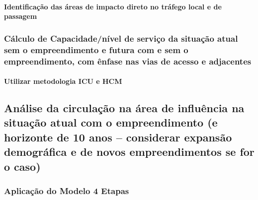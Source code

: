 \documentclass[]{article}
\let\oldparagraph\paragraph
\renewcommand{\paragraph}[1]{\oldparagraph{#1}\mbox{}}
\begin{document}
\hypertarget{identificauxe7uxe3o-das-uxe1reas-de-impacto-direto-no-truxe1fego-local-e-de-passagem}{%
\paragraph{Identificação das áreas de impacto direto no tráfego local e
de
passagem}\label{identificauxe7uxe3o-das-uxe1reas-de-impacto-direto-no-truxe1fego-local-e-de-passagem}}

\hypertarget{cuxe1lculo-de-capacidadenuxedvel-de-serviuxe7o-da-situauxe7uxe3o-atual-sem-o-empreendimento-e-futura-com-e-sem-o-empreendimento-com-uxeanfase-nas-vias-de-acesso-e-adjacentes}{%
\subsubsection{Cálculo de Capacidade/nível de serviço da situação atual
sem o empreendimento e futura com e sem o empreendimento, com ênfase nas
vias de acesso e
adjacentes}\label{cuxe1lculo-de-capacidadenuxedvel-de-serviuxe7o-da-situauxe7uxe3o-atual-sem-o-empreendimento-e-futura-com-e-sem-o-empreendimento-com-uxeanfase-nas-vias-de-acesso-e-adjacentes}}

\hypertarget{utilizar-metodologia-icu-e-hcm}{%
\paragraph{Utilizar metodologia ICU e
HCM}\label{utilizar-metodologia-icu-e-hcm}}

\hypertarget{anuxe1lise-da-circulauxe7uxe3o-na-uxe1rea-de-influuxeancia-na-situauxe7uxe3o-atual-com-o-empreendimento-e-horizonte-de-10-anos-considerar-expansuxe3o-demogruxe1fica-e-de-novos-empreendimentos-se-for-o-caso}{%
\subsection{Análise da circulação na área de influência na situação
atual com o empreendimento (e horizonte de 10 anos -- considerar
expansão demográfica e de novos empreendimentos se for o
caso)}\label{anuxe1lise-da-circulauxe7uxe3o-na-uxe1rea-de-influuxeancia-na-situauxe7uxe3o-atual-com-o-empreendimento-e-horizonte-de-10-anos-considerar-expansuxe3o-demogruxe1fica-e-de-novos-empreendimentos-se-for-o-caso}}

\hypertarget{aplicauxe7uxe3o-do-modelo-4-etapas}{%
\subsubsection{Aplicação do Modelo 4
Etapas}\label{aplicauxe7uxe3o-do-modelo-4-etapas}}
\end{document}
